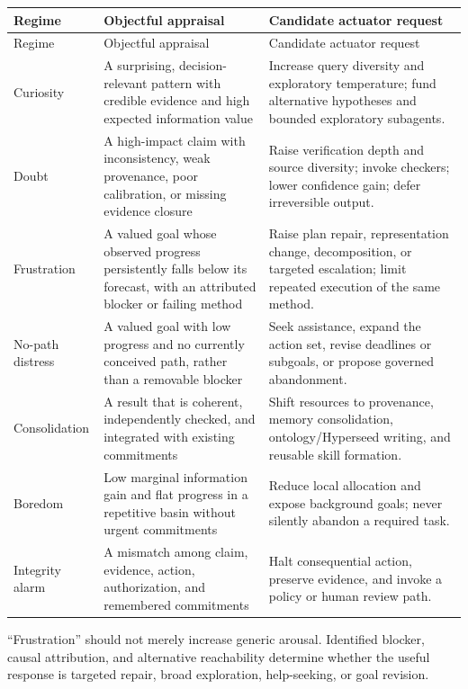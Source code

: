 \documentclass[11pt]{article}
\begin{document}
\begin{longtable}{p{}p{}p{}}
\toprule
Regime & Objectful appraisal & Candidate actuator request \\
\midrule
\endfirsthead
\toprule
Regime & Objectful appraisal & Candidate actuator request \\
\midrule
\endhead
Curiosity & A surprising, decision-relevant pattern with credible evidence and
high expected information value & Increase query diversity and exploratory
temperature; fund alternative hypotheses and bounded exploratory subagents. \\
Doubt & A high-impact claim with inconsistency, weak provenance, poor
calibration, or missing evidence closure & Raise verification depth and source
diversity; invoke checkers; lower confidence gain; defer irreversible output. \\
Frustration & A valued goal whose observed progress persistently falls below its
forecast, with an attributed blocker or failing method & Raise plan repair,
representation change, decomposition, or targeted escalation; limit repeated
execution of the same method. \\
No-path distress & A valued goal with low progress and no currently conceived
path, rather than a removable blocker & Seek assistance, expand the action set,
revise deadlines or subgoals, or propose governed abandonment. \\
Consolidation & A result that is coherent, independently checked,
and integrated with existing commitments & Shift resources to provenance,
memory consolidation, ontology/Hyperseed writing, and reusable skill formation. \\
Boredom & Low marginal information gain and flat progress in a repetitive basin
without urgent commitments & Reduce local allocation and expose background
goals; never silently abandon a required task. \\
Integrity alarm & A mismatch among claim, evidence, action, authorization, and
remembered commitments & Halt consequential action, preserve evidence, and
invoke a policy or human review path. \\
\bottomrule
\end{longtable}

``Frustration'' should not merely increase generic arousal.  Identified blocker,
causal attribution, and alternative reachability determine whether the useful
response is targeted repair, broad exploration, help-seeking, or goal revision.
\end{document}
